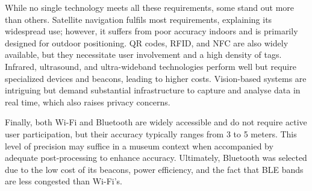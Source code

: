 While no single technology meets all these requirements, some stand out more than others. Satellite navigation fulfils most requirements, explaining its widespread use; however, it suffers from poor accuracy indoors and is primarily designed for outdoor positioning. QR codes, RFID, and NFC are also widely available, but they necessitate user involvement and a high density of tags. Infrared, ultrasound, and ultra-wideband technologies perform well but require specialized devices and beacons, leading to higher costs. Vision-based systems are intriguing but demand substantial infrastructure to capture and analyse data in real time, which also raises privacy concerns.  

Finally, both Wi-Fi and Bluetooth are widely accessible and do not require active user participation, but their accuracy typically ranges from 3 to 5 meters. This level of precision may suffice in a museum context when accompanied by adequate post-processing to enhance accuracy. Ultimately, Bluetooth was selected due to the low cost of its beacons, power efficiency, and the fact that BLE bands are less congested than Wi-Fi's. 

